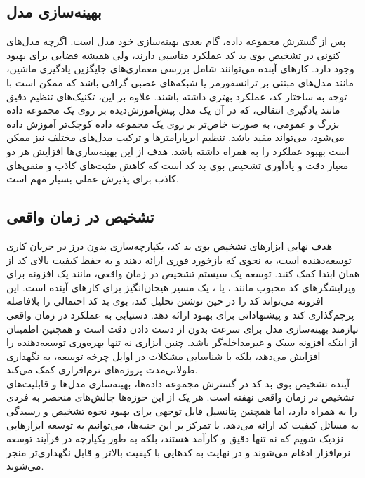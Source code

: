 \subsection{بهینه‌سازی مدل}

پس از گسترش مجموعه داده، گام بعدی بهینه‌سازی خود مدل است. اگرچه مدل‌های کنونی در تشخیص بوی بد کد عملکرد مناسبی دارند، ولی همیشه فضایی برای بهبود وجود دارد. کارهای آینده می‌توانند شامل بررسی معماری‌های جایگزین یادگیری ماشین، مانند مدل‌های مبتنی بر ترانسفورمر یا شبکه‌های عصبی گرافی باشد که ممکن است با توجه به ساختار کد، عملکرد بهتری داشته باشند. علاوه بر این، تکنیک‌های تنظیم دقیق مانند یادگیری انتقالی، که در آن یک مدل پیش‌آموزش‌دیده بر روی یک مجموعه داده بزرگ و عمومی، به صورت خاص‌تر بر روی یک مجموعه داده کوچک‌تر آموزش داده می‌شود، می‌تواند مفید باشد. تنظیم ابرپارامترها و ترکیب مدل‌های مختلف نیز ممکن است بهبود عملکرد را به همراه داشته باشد. هدف از این بهینه‌سازی‌ها افزایش هر دو معیار دقت و یادآوری تشخیص بوی بد کد است که کاهش مثبت‌های کاذب و منفی‌های کاذب برای پذیرش عملی بسیار مهم است.

\subsection{تشخیص در زمان واقعی}

هدف نهایی ابزارهای تشخیص بوی بد کد، یکپارچه‌سازی بدون درز در جریان کاری توسعه‌دهنده است، به نحوی که بازخورد فوری ارائه دهند و به حفظ کیفیت بالای کد از همان ابتدا کمک کنند. توسعه یک سیستم تشخیص در زمان واقعی، مانند یک افزونه برای ویرایشگرهای کد محبوب مانند ،  یا ، یک مسیر هیجان‌انگیز برای کارهای آینده است. این افزونه می‌تواند کد را در حین نوشتن تحلیل کند، بوی بد کد احتمالی را بلافاصله پرچم‌گذاری کند و پیشنهاداتی برای بهبود ارائه دهد. دستیابی به عملکرد در زمان واقعی نیازمند بهینه‌سازی مدل برای سرعت بدون از دست دادن دقت است و همچنین اطمینان از اینکه افزونه سبک و غیرمداخله‌گر باشد. چنین ابزاری نه تنها بهره‌وری توسعه‌دهنده را افزایش می‌دهد، بلکه با شناسایی مشکلات در اوایل چرخه توسعه، به نگهداری طولانی‌مدت پروژه‌های نرم‌افزاری کمک می‌کند.
\\
آینده تشخیص بوی بد کد در گسترش مجموعه داده‌ها، بهینه‌سازی مدل‌ها و قابلیت‌های تشخیص در زمان واقعی نهفته است. هر یک از این حوزه‌ها چالش‌های منحصر به فردی را به همراه دارد، اما همچنین پتانسیل قابل توجهی برای بهبود نحوه تشخیص و رسیدگی به مسائل کیفیت کد ارائه می‌دهد. با تمرکز بر این جنبه‌ها، می‌توانیم به توسعه ابزارهایی نزدیک شویم که نه تنها دقیق و کارآمد هستند، بلکه به طور یکپارچه در فرآیند توسعه نرم‌افزار ادغام می‌شوند و در نهایت به کدهایی با کیفیت بالاتر و قابل نگهداری‌تر منجر می‌شوند.
\clearpage
